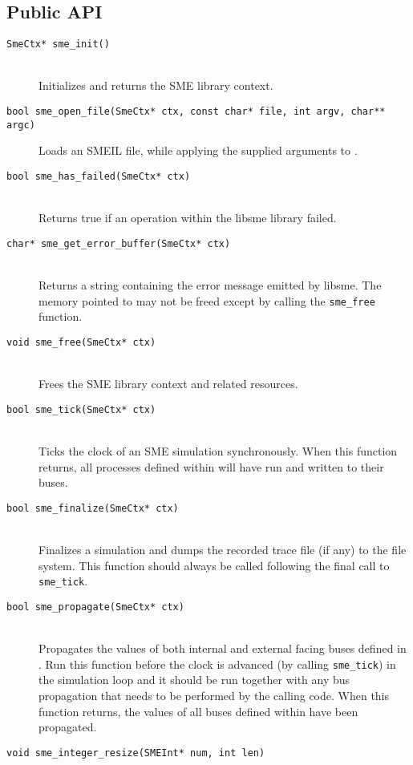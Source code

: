 \subsection{Public API}
\begin{description}
\item[\texttt{SmeCtx* sme\_init()}]\hfill\\
   Initializes and returns the SME library context.
 \item[\texttt{bool sme_open_file(SmeCtx* ctx, const char* file, int argv,
     char** argc)}]\hfill Loads an SMEIL file, while applying the supplied
   arguments to \libsme{}.
   \item[\texttt{bool sme_has_failed(SmeCtx* ctx)}]\hfill\\
     Returns true if an operation within the libsme library failed.
 \item[\texttt{char* sme_get_error_buffer(SmeCtx* ctx)}]\hfill\\
   Returns a string containing the error message emitted by libsme. The memory
   pointed to may not be freed except by calling the \texttt{sme_free} function.
 \item[\texttt{void sme_free(SmeCtx* ctx)}]\hfill\\
   Frees the SME library context and related resources.
 \item[\texttt{bool sme_tick(SmeCtx* ctx)}]\hfill\\
   Ticks the clock of an SME simulation synchronously. When this function
   returns, all processes defined within \libsme{} will have run and written to
   their buses.
 \item[\texttt{bool sme_finalize(SmeCtx* ctx)}]\hfill\\
   Finalizes a simulation and dumps the recorded trace file (if any) to the file
   system. This function should always be called following the final call to
   \texttt{sme_tick}.
 \item[\texttt{bool sme_propagate(SmeCtx* ctx)}]\hfill\\
   Propagates the values of both internal and external facing buses defined in
   \libsme{}. Run this function before the clock is advanced (by calling
   \texttt{sme_tick}) in the simulation loop and it should be run together with
   any bus propagation that needs to be performed by the calling code. When this
   function returns, the values of all buses defined within \libsme{} have been
   propagated.
 \item[\texttt{void sme_integer_resize(SMEInt* num, int len)}]\hfill\\

\end{description}
